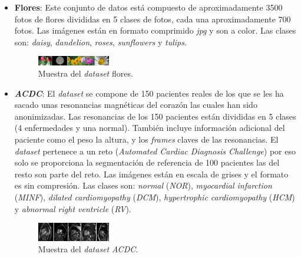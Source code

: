 \documentclass[12pt,a4paper]{article}
\begin{document}
\begin{itemize}
\item \textbf{Flores}: Este conjunto de datos está compuesto de aproximadamente 3500 fotos de flores divididas en 5 clases de fotos, cada una aproximadamente 700 fotos. Las imágenes están en formato comprimido \textit{jpg} y son a color. Las clases son: \textit{daisy}, \textit{dandelion}, \textit{roses}, \textit{sunflowers} y \textit{tulips}.

\begin{figure}[H]
\centering
\includegraphics[width=0.3\textwidth]{img/flores}
\caption{Muestra del \textit{dataset} flores.}
\end{figure}

\item \textbf{\textit{ACDC}}: El \textit{dataset} \cite{acdcdataset} se compone de 150 pacientes reales de los que se les ha sacado unas resonancias magnéticas del corazón las cuales han sido anonimizadas. Las resonancias de los 150 pacientes están divididas en 5 clases (4 enfermedades y una normal). También incluye información adicional del paciente como el peso la altura, y los \textit{frames} claves de las resonancias. El \textit{dataset} pertenece a un reto (\textit{Automated Cardiac Diagnosis Challenge}) por eso solo se proporciona la segmentación de referencia de 100 pacientes las del resto son parte del reto. Las imágenes están en escala de grises y el formato es sin compresión. Las clases son: \textit{normal} (\textit{NOR}), \textit{myocardial infarction} (\textit{MINF}), \textit{dilated cardiomyopathy} (\textit{DCM}), \textit{hypertrophic cardiomyopathy} (\textit{HCM}) y \textit{abnormal right ventricle} (\textit{RV}).

\begin{figure}[H]
\centering
\includegraphics[width=0.3\textwidth]{img/acdc}
\caption{Muestra del \textit{dataset} \textit{ACDC}.}
\end{figure}




\end{itemize}
\end{document}
